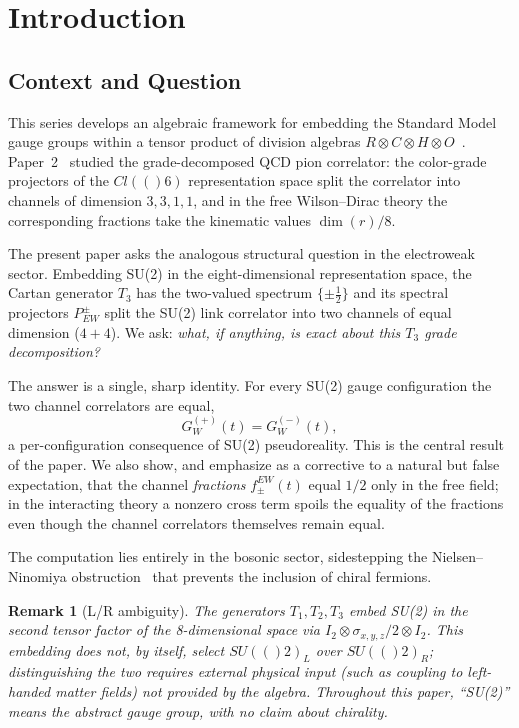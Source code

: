 \documentclass[12pt,a4paper]{article}
\newtheorem{remark}{Remark}[section]
\newcommand{\Cl}{\mathrm{Cl}}
\newcommand{\SU}{\mathrm{SU}}
\newcommand{\HH}{\mathbb{H}}
\newcommand{\RR}{\mathbb{R}}
\newcommand{\CC}{\mathbb{C}}
\newcommand{\OO}{\mathbb{O}}
\newcommand{\Id}[1]{I_{#1}}
\newcommand{\Pew}[1]{P^{#1}_{\mathrm{EW}}}
\newcommand{\fEW}[1]{f_{#1}^{\mathrm{EW}}}
\def\Cl#1{Cl(#1)}%
\def\SU#1{SU(#1)}%
\def\HH{H}%
\def\RR{R}%
\def\CC{C}%
\def\OO{O}%
\def\mathbb#1{#1}%
\def\mathrm#1{#1}%
\begin{document}
	
	\section{Introduction}
	
\subsection{Context and Question}

This series develops an algebraic framework for embedding the Standard Model gauge
groups within a tensor product of division algebras
$\RR\otimes\CC\otimes\HH\otimes\OO$~\cite{P1,P2}.  Paper~2~\cite{P2} studied the
grade-decomposed QCD pion correlator: the color-grade projectors of the $\Cl(6)$
representation space split the correlator into channels of dimension
$3,3,1,1$, and in the free Wilson--Dirac theory the corresponding fractions take
the kinematic values $\dim(r)/8$.

The present paper asks the analogous structural question in the electroweak sector.
Embedding SU(2) in the eight-dimensional representation space, the Cartan generator
$T_3$ has the two-valued spectrum $\{\pm\tfrac12\}$ and its spectral projectors
$\Pew{\pm}$ split the SU(2) link correlator into two channels of equal dimension
($4+4$).  We ask: \emph{what, if anything, is exact about this $T_3$ grade
	decomposition?}

The answer is a single, sharp identity.  For every SU(2) gauge configuration the
two channel correlators are equal,
\[
G_W^{(+)}(t) = G_W^{(-)}(t),
\]
a per-configuration consequence of SU(2) pseudoreality.  This is the central result
of the paper.  We also show, and emphasize as a corrective to a natural but false
expectation, that the channel \emph{fractions} $\fEW{\pm}(t)$ equal $1/2$ only in
the free field; in the interacting theory a nonzero cross term spoils the equality
of the fractions even though the channel correlators themselves remain equal.

The computation lies entirely in the bosonic sector, sidestepping the
Nielsen--Ninomiya obstruction~\cite{NN1,NN2} that prevents the inclusion of chiral
fermions.
	
	\begin{remark}[L/R ambiguity]
		The generators $T_1,T_2,T_3$ embed SU(2) in the second tensor factor of the
		8-dimensional space via $\Id{2}\otimes\sigma_{x,y,z}/2\otimes\Id{2}$.  This
		embedding does not, by itself, select $\SU(2)_L$ over $\SU(2)_R$; distinguishing
		the two requires external physical input (such as coupling to left-handed matter
		fields) not provided by the algebra.  Throughout this paper, ``SU(2)'' means the
		abstract gauge group, with no claim about chirality.
	\end{remark}
	
\end{document}

